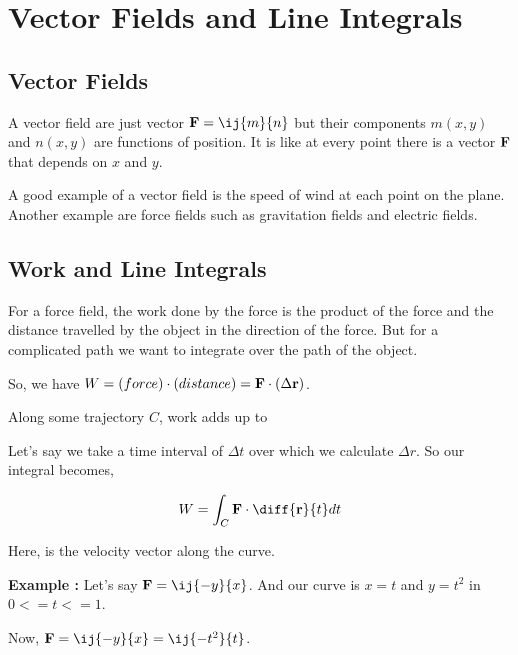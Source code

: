 

\chapter{Vector Fields and Line Integrals}

\bigbreak

\section{Vector Fields}

A vector field are just vector ${\bf F} = \ij{m}{n}$ but their components $m(x, y)$ and $n(x, y)$ are functions of position.
It is like at every point there is a vector ${\bf F}$ that depends on $x$ and $y$.

A good example of a vector field is the speed of wind at each point on the plane.
Another example are force fields such as gravitation fields and electric fields.

\section{Work and Line Integrals}

For a force field, the work done by the force is the product of the force and the distance travelled by the object in the direction of the force.
But for a complicated path we want to integrate over the path of the object.

So, we have $W = (force)\cdot(distance) = {\bf F} \cdot (\Delta {\bf r})$.

Along some trajectory $C$, work adds up to 

Let's say we take a time interval of $\Delta t$ over which we calculate $\Delta r$. So our integral becomes, 

$$ W = \int_C {\bf F} \cdot \diff{{\bf r}}{t} dt $$

Here,  is the velocity vector along the curve.

\bigbreak

{\bf Example : } Let's say ${\bf F} = \ij{-y}{x}$. And our curve is $x = t$ and $y = t^2$ in $0 <= t <= 1$.

Now, ${\bf F} = \ij{-y}{x} = \ij{-t^2}{t}$.

